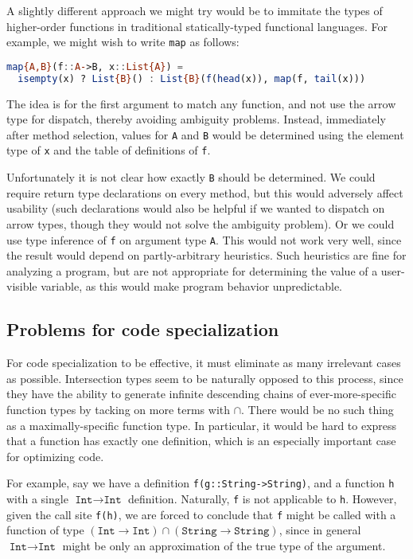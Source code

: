 A slightly different approach we might try would be to immitate
the types of higher-order functions in traditional
statically-typed functional languages. For example, we might wish
to write \texttt{map} as follows:

\begin{singlespace}
\begin{lstlisting}[language=julia]
map{A,B}(f::A->B, x::List{A}) =
  isempty(x) ? List{B}() : List{B}(f(head(x)), map(f, tail(x)))
\end{lstlisting}
\end{singlespace}

The idea is for the first argument to match any function, and not use
the arrow type for dispatch, thereby avoiding ambiguity problems.
Instead, immediately after method selection, values for \texttt{A} and
\texttt{B} would be determined using the element type of \texttt{x}
and the table of definitions of \texttt{f}.

Unfortunately it is not clear how exactly \texttt{B} should be
determined. We could require return type declarations on every method,
but this would adversely affect usability (such declarations would also
be helpful if we wanted to dispatch on arrow types, though they would
not solve the ambiguity problem). Or we could use type inference
of \texttt{f} on argument type \texttt{A}. This would not work very
well, since the result would depend on partly-arbitrary heuristics.
Such heuristics are fine for analyzing a program, but
are not appropriate for determining the value of a user-visible
variable, as this would make program behavior unpredictable.

\subsection{Problems for code specialization}

For code specialization to be effective, it must eliminate as many
irrelevant cases as possible. Intersection types seem to be naturally
opposed to this process, since they have the ability to
generate infinite descending chains of ever-more-specific function
types by tacking on more terms with $\cap$. There would be no such
thing as a maximally-specific function type. In particular, it would be
hard to express that a function has exactly one definition,
which is an especially important case for optimizing code.

For example, say we have a definition \texttt{f(g::String->String)},
and a function \texttt{h} with a single $\texttt{Int}\rightarrow\texttt{Int}$ definition.
Naturally, \texttt{f} is not applicable to \texttt{h}.
However, given the call site \texttt{f(h)}, we are forced to conclude
that \texttt{f} might be called with a function of type
\mbox{$(\texttt{Int}\rightarrow\texttt{Int})\cap(\texttt{String}\rightarrow\texttt{String})$},
since in general $\texttt{Int}\rightarrow\texttt{Int}$ might be only an
approximation of the true type of the argument.

